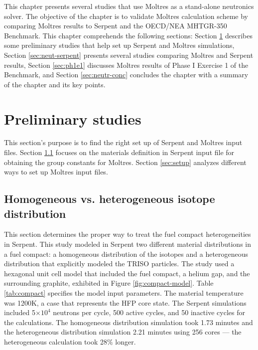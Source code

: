 \label{ch:neutronics}

This chapter presents several studies that use Moltres as a stand-alone neutronics solver.
The objective of the chapter is to validate Moltres calculation scheme by comparing Moltres results to Serpent and the OECD/NEA MHTGR-350 Benchmark.
This chapter comprehends the following sections: Section \ref{sec:neut-prelim} describes some preliminary studies that help set up Serpent and Moltres simulations, Section \ref{sec:neut-serpent} presents several studies comparing Moltres and Serpent results, Section \ref{sec:ph1e1} discusses Moltres results of Phase I Exercise 1 of the Benchmark, and Section \ref{sec:neutr-conc} concludes the chapter with a summary of the chapter and its key points.

\section{Preliminary studies}
\label{sec:neut-prelim}

This section's purpose is to find the right set up of Serpent and Moltres input files.
Section \ref{sec:homo-hetero} focuses on the materials definition in Serpent input file for obtaining the group constants for Moltres.
Section \ref{sec:setup} analyzes different ways to set up Moltres input files.

\subsection{Homogeneous vs. heterogeneous isotope distribution}
\label{sec:homo-hetero}

This section determines the proper way to treat the fuel compact heterogeneities in Serpent.
This study modeled in Serpent two different material distributions in a fuel compact: a homogeneous distribution of the isotopes and a heterogeneous distribution that explicitly modeled the TRISO particles.
The study used a hexagonal unit cell model that included the fuel compact, a helium gap, and the surrounding graphite, exhibited in Figure \ref{fig:compact-model}.
Table \ref{tab:compact} specifies the model input parameters.
The material temperature was 1200K, a case that represents the \gls{HFP} core state.
The Serpent simulations included 5$\times 10^4$ neutrons per cycle, 500 active cycles, and 50 inactive cycles for the calculations.
The homogeneous distribution simulation took 1.73 minutes and the heterogeneous distribution simulation 2.21 minutes using 256 cores --- the heterogeneous calculation took 28$\%$ longer.

